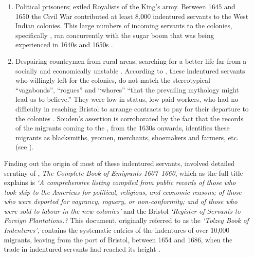 \renewcommand{\labelenumii}{\theenumii}
\begin{enumerate}
\item{Political prisoners; exiled Royalists of the King's army. Between 1645 and 1650 the  Civil War contributed at least 8,000 indentured servants to the West Indian colonies. This large numbers of incoming servants to the  colonies, specifically , ran concurrently with the sugar boom that was being experienced in 1640s and 1650s \citep{Brewer96}.}
\item{Despairing  countrymen from rural areas, searching for a better life far from a socially and economically unstable . According to \citet[167]{Souden88}, these indentured servants who willingly left for the colonies, do not match the stereotypical ``vagabonds'', ``rogues'' and ``whores'' ``that the prevailing mythology might lead us to believe.'' They were low in status, low-paid workers, who had no difficulty in reaching Bristol to arrange contracts to pay for their departure to the colonies \citep{Souden88}. Souden's assertion is corroborated by the fact that the records of the migrants coming to the , from the 1630s onwards, identifies these migrants as blacksmiths, yeomen, merchants, shoemakers and farmers, etc. (see \citealt{Coldham87, Sacks93}).}
\end{enumerate}

Finding out the origin of most of these indentured servants, involved detailed scrutiny of  , \emph{The Complete Book of Emigrants 1607--1660}, which as the full title explains is \emph{`A comprehensive listing compiled from  public records of those who took ship to the Americas for political, religious, and economic reasons; of those who were deported for vagrancy, roguery, or non-conformity; and of those who were sold to labour in the new colonies'} and the Bristol \emph{`Register of Servants to Foreign Plantations.?} This document, originally referred to as the \emph{`Tolzey Book of Indentures',} contains the systematic entries of the indentures of over 10,000  migrants, leaving from the port of Bristol, between 1654 and 1686, when the trade in indentured servants had reached its height \citep{Currer82, Morgan93}.

